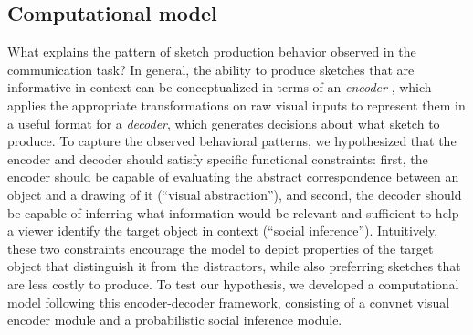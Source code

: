 \documentclass[9pt,twocolumn,twoside]{pnas-new}
\newcommand{\mwu}[1]{{\color{green}{[mwu: #1]}}}
\begin{document}

\subsection*{Computational model}

What explains the pattern of sketch production behavior observed in the communication task?
In general, the ability to produce sketches that are informative in context can be conceptualized in terms of an \textit{encoder} \mwu{is this a function or a model? what is an encoder? Maybe be useful to give a rigorous definition.}, which applies the appropriate transformations on raw visual inputs to represent them in a useful format for a \textit{decoder}, which generates decisions about what sketch to produce.
To capture the observed behavioral patterns, we hypothesized that the encoder and decoder should satisfy specific functional constraints: first, the encoder should be capable of evaluating the abstract correspondence between an object and a drawing of it (``visual abstraction''), and second, the decoder should be capable of inferring what information would be relevant and sufficient to help a viewer identify the target object in context (``social inference'').
Intuitively, these two constraints encourage the model to depict properties of the target object that distinguish it from the distractors, while also preferring sketches that are less costly to produce.
To test our hypothesis, we developed a computational model following this encoder-decoder framework, consisting of a convnet \mwu{``convolutional"} visual encoder module and a probabilistic social inference module.

\end{document}
